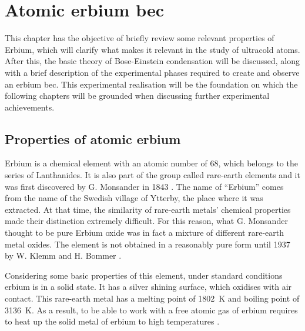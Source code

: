 
\chapter{Atomic erbium \acl*{bec}}
\label{chap:erbium_bec}

This chapter has the objective of briefly review some relevant properties of Erbium, which will clarify what makes it relevant in the study of ultracold atoms. After this, the basic theory of Bose-Einstein condensation will be discussed, along with a brief description of the experimental phases required to create and observe an erbium \ac{bec}. This experimental realisation will be the foundation on which the following chapters will be grounded when discussing further experimental achievements.

\section{Properties of atomic erbium} \label{sec:erbium_properties}
Erbium is a chemical element with an atomic number of 68, which belongs to the series of Lanthanides. It is also part of the group called rare-earth elements and it was first discovered by G. Monsander in 1843 \cite{mosander1843xxx}. The name of ``Erbium'' comes from the name of the Swedish village of Ytterby, the place where it was extracted. At that time, the similarity of rare-earth metals' chemical properties made their distinction extremely difficult. For this reason, what G. Monsander thought to be pure Erbium oxide was in fact a mixture of different rare-earth metal oxides. The element is not obtained in a reasonably pure form until 1937 by W. Klemm and H. Bommer \cite{klemm1937bommer}.

Considering some basic properties of this element, under standard conditions erbium is in a solid state. It has a silver shining surface, which oxidises with air contact. This rare-earth metal has a melting point of \SI{1802}{\kelvin} and boiling point of \SI{3136}{\kelvin}. As a result, to be able to work with a free atomic gas of erbium requires to heat up the solid metal of erbium to high temperatures \cite{emsley1998}.

